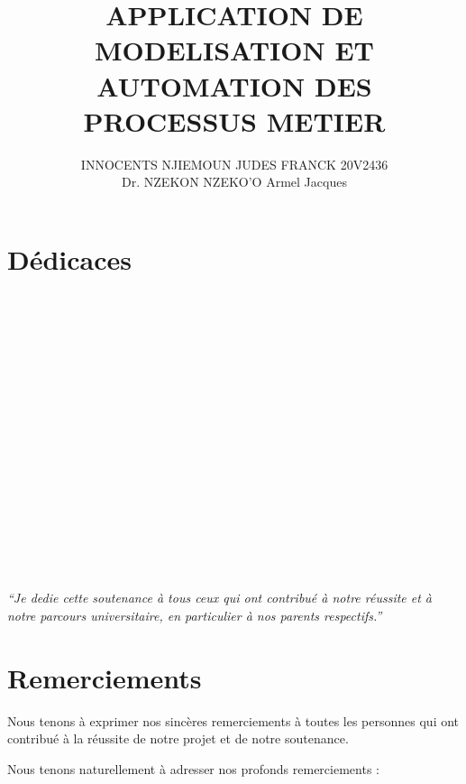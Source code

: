 \documentclass[12pt,a4paper,oneside]{extbook}
\title{\fontsize{20}{30}\selectfont APPLICATION DE MODELISATION ET AUTOMATION DES PROCESSUS METIER}
\author{\fontsize{15}{36}\selectfont INNOCENTS NJIEMOUN JUDES FRANCK 20V2436 \\
\fontsize{15}{36}\selectfont Dr. NZEKON NZEKO'O Armel Jacques }
\begin{document}


\maketitle
\thispagestyle{empty}
\clearpage
\setcounter{page}{1}
\pagestyle{fancy}
\fancyhf{}
\cfoot{\thepage}
\renewcommand{\headrulewidth}{0pt}
\renewcommand{\footrulewidth}{0pt}
\fancypagestyle{plain}{%
  \fancyhf{}
  \cfoot{\thepage}
  \renewcommand{\headrulewidth}{0pt}
  \renewcommand{\footrulewidth}{0pt}
}
\vspace{0.5cm}
\section*{Dédicaces}
\ \\ \ \\ \ \\ \ \\ \ \\ \ \\ \ \\ \ \\ \ \\ \ \\ \ \\ \ \\ \ \\ \ \\ \ \\ \ \\
\begin{center}
     \textit{
 ``Je dedie cette soutenance à tous ceux qui ont contribué à notre réussite et à notre parcours universitaire, en particulier à nos parents respectifs.''}
\end{center}


\newpage
{}
 \section*{Remerciements}
Nous tenons à exprimer nos sincères remerciements à toutes les personnes qui ont contribué à la réussite de notre projet et de notre soutenance.

Nous tenons naturellement à adresser nos profonds remerciements :
\end{document}
